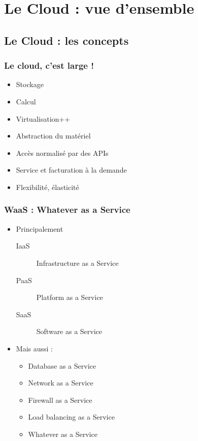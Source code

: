   \section[Cloud]{Le Cloud : vue d'ensemble}

  \subsection[Cloud]{Le Cloud : les concepts}

  \begin{frame}
    \frametitle{Le cloud, c'est large !}
    \begin{itemize}
      \item Stockage \pause
      \item Calcul \pause
      \item Virtualisation++\pause
      \item Abstraction du matériel\pause
      \item \alert<8->{Accès normalisé par des APIs}\pause
      \item Service et facturation à la demande\pause
      \item \alert<9->{Flexibilité, élasticité}
    \end{itemize}
  \end{frame}

  \begin{frame}
    \frametitle{WaaS : Whatever as a Service}
    \begin{itemize}
      \item Principalement\pause
      \begin{description}
        \item[IaaS] \alert<5->{Infrastructure as a Service}\pause
        \item[PaaS] Platform as a Service\pause
        \item[SaaS] Software as a Service\pause
      \end{description}
      \pause
      \item Mais aussi :
      \pause
      \begin{itemize}
        \item Database as a Service
        \item Network as a Service
        \item Firewall as a Service
        \item Load balancing as a Service\pause
        \item Whatever as a Service
      \end{itemize}
    \end{itemize}
  \end{frame}

